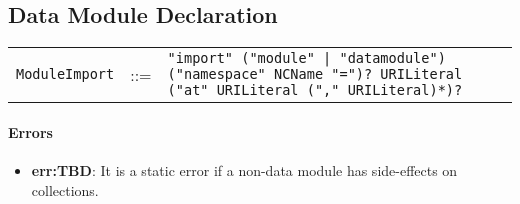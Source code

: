 \documentclass[]{article}
\begin{document}
\subsection{Data Module Declaration}
\begin{tabular}{l c p{12cm}}
{\tt ModuleImport} & ::= & {\tt "import" ("module" | "datamodule") ("namespace" NCName "=")? URILiteral ("at" URILiteral ("," URILiteral)*)? }
\end{tabular}

\vspace{0.5cm}

\paragraph{Errors}
\begin{itemize}
  \item \textbf{err:TBD}: It is a static error if a non-data module has side-effects on collections.
\end{itemize}
\end{document}
